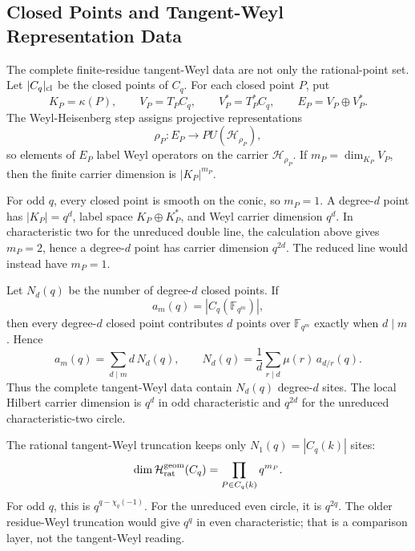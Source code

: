 \subsection{Closed Points and Tangent-Weyl Representation Data}
The complete finite-residue tangent-Weyl data are not only the rational-point
set.  Let \(|C_q|_{\rm cl}\) be the closed points of \(C_q\).  For each closed
point \(P\), put
\[
  K_P=\kappa(P),\qquad V_P=T_PC_q,\qquad V_P^*=T_P^*C_q,\qquad
  E_P=V_P\oplus V_P^* .
\]
The Weyl-Heisenberg step assigns projective representations
\[
  \rho_P:E_P\to PU(\mathcal H_{\rho_P}),
\]
so elements of \(E_P\) label Weyl operators on the carrier
\(\mathcal H_{\rho_P}\).  If \(m_P=\dim_{K_P}V_P\), then the finite carrier
dimension is \(|K_P|^{m_P}\).

For odd \(q\), every closed point is smooth on the conic, so \(m_P=1\).  A
degree-\(d\) point has \(|K_P|=q^d\), label space \(K_P\oplus K_P^*\), and Weyl
carrier dimension \(q^d\).  In characteristic two for the unreduced double
line, the calculation above gives \(m_P=2\), hence a degree-\(d\) point has
carrier dimension \(q^{2d}\).  The reduced line would instead have \(m_P=1\).

Let \(N_d(q)\) be the number of degree-\(d\) closed points.  If
\[
  a_m(q)=|C_q(\mathbb F_{q^m})|,
\]
then every degree-\(d\) closed point contributes \(d\) points over
\(\mathbb F_{q^m}\) exactly when \(d\mid m\).  Hence
\[
  a_m(q)=\sum_{d\mid m}d\,N_d(q),
  \qquad
  N_d(q)=\frac1d\sum_{r\mid d}\mu(r)\,a_{d/r}(q).
\]
Thus the complete tangent-Weyl data contain \(N_d(q)\) degree-\(d\) sites.  The
local Hilbert carrier dimension is \(q^d\) in odd characteristic and \(q^{2d}\)
for the unreduced characteristic-two circle.

The rational tangent-Weyl truncation keeps only \(N_1(q)=|C_q(k)|\) sites:
\[
  \dim\mathcal H_{\rm rat}^{\rm geom}(C_q)
  =
  \prod_{P\in C_q(k)}q^{m_P}.
\]
For odd \(q\), this is \(q^{q-\chi_q(-1)}\).  For the unreduced even circle, it
is \(q^{2q}\).  The older residue-Weyl truncation would give \(q^q\) in even
characteristic; that is a comparison layer, not the tangent-Weyl reading.
